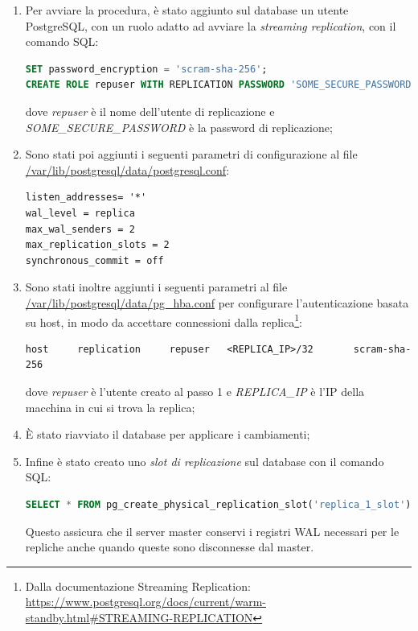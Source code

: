 \begin{enumerate}
  \item Per avviare la procedura, è stato aggiunto sul database un utente PostgreSQL, con un ruolo adatto ad avviare la \textit{streaming replication}, con il comando SQL:
  \vspace{1mm}
   \begin{lstlisting}[language=sql]
SET password_encryption = 'scram-sha-256'; 
CREATE ROLE repuser WITH REPLICATION PASSWORD 'SOME_SECURE_PASSWORD' LOGIN;\end{lstlisting}
dove \textit{repuser} è il nome dell'utente di replicazione e \textit{SOME\_SECURE\_PASSWORD} è la password di replicazione;
  \item Sono stati poi aggiunti i seguenti parametri di configurazione al file \url{/var/lib/postgresql/data/postgresql.conf}:
  \vspace{1mm}
  \begin{lstlisting}[]
listen_addresses= '*'
wal_level = replica
max_wal_senders = 2
max_replication_slots = 2
synchronous_commit = off
\end{lstlisting}

  \item Sono stati inoltre aggiunti i seguenti parametri al file \url{/var/lib/postgresql/data/pg_hba.conf} per configurare l'autenticazione basata su host, in modo da accettare connessioni dalla replica\footnote{Dalla documentazione Streaming Replication: \url{https://www.postgresql.org/docs/current/warm-standby.html\#STREAMING-REPLICATION}}:
  \vspace{1mm}
\begin{lstlisting}[]
host     replication     repuser   <REPLICA_IP>/32       scram-sha-256
\end{lstlisting}
dove \textit{repuser} è l'utente creato al passo 1 e \textit{REPLICA\_IP} è l'IP della macchina in cui si trova la replica;
  \item È stato riavviato il database per applicare i cambiamenti;
  \item Infine è stato creato uno \textit{slot di replicazione} sul database con il comando SQL:
  \vspace{1mm}
  \begin{lstlisting}[language=sql]
SELECT * FROM pg_create_physical_replication_slot('replica_1_slot');
\end{lstlisting}
Questo assicura che il server master conservi i registri WAL necessari per le repliche anche quando queste sono disconnesse dal master.
\end{enumerate}

